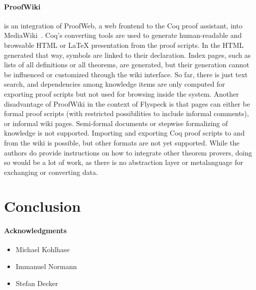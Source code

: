 \documentclass{llncs}
\begin{document}
\paragraph{ProofWiki} is an integration of ProofWeb, a web frontend to the Coq proof
assistant, into MediaWiki~\cite{CorKal:CoopReposFormalProofs07}.  Coq's converting tools
are used to generate human-readable and browsable HTML or {\LaTeX} presentation from the proof
scripts.  In the HTML generated that way, symbols are linked to their declaration.  Index
pages, such as lists of all definitions or all theorems, are generated, but their
generation cannot be influenced or customized through the wiki
interface.  So far, there is just text search, and dependencies
among knowledge items are only computed for exporting proof scripts but not used for
browsing inside the system.  Another disadvantage of ProofWiki in the context of Flyspeck
is that pages can either be formal proof scripts (with restricted possibilities to include
informal comments), or informal wiki pages.  Semi-formal documents or stepwise formalizing
of knowledge is not supported.  Importing and exporting Coq proof scripts to and from the
wiki is possible, but other formats are not yet supported.  While the authors do provide
instructions on how to integrate other theorem provers, doing so would be a lot of work,
as there is no abstraction layer or metalanguage for exchanging or converting data.


\section{Conclusion}
\label{sec:conc}


\paragraph{Acknowledgments}
\label{sec:ack}

\begin{itemize}
\item Michael Kohlhase
\item Immanuel Normann
\item Stefan Decker
\end{itemize}





\ednotemessage
\end{document}
